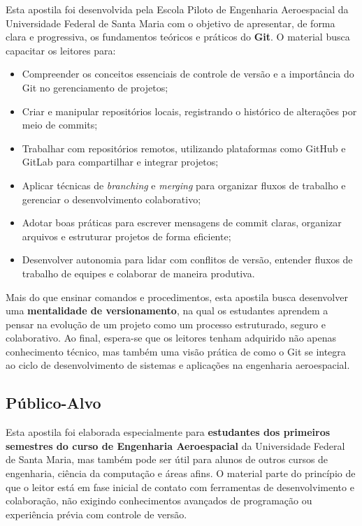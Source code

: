 Esta apostila foi desenvolvida pela Escola Piloto de Engenharia Aeroespacial da Universidade Federal de Santa Maria com o objetivo de apresentar, de forma clara e progressiva, os fundamentos teóricos e práticos do \textbf{Git}. O material busca capacitar os leitores para:

\begin{itemize}
    \item Compreender os conceitos essenciais de controle de versão e a importância do Git no gerenciamento de projetos;
    \item Criar e manipular repositórios locais, registrando o histórico de alterações por meio de commits;
    \item Trabalhar com repositórios remotos, utilizando plataformas como GitHub e GitLab para compartilhar e integrar projetos;
    \item Aplicar técnicas de \textit{branching} e \textit{merging} para organizar fluxos de trabalho e gerenciar o desenvolvimento colaborativo;
    \item Adotar boas práticas para escrever mensagens de commit claras, organizar arquivos e estruturar projetos de forma eficiente;
    \item Desenvolver autonomia para lidar com conflitos de versão, entender fluxos de trabalho de equipes e colaborar de maneira produtiva.
\end{itemize}

Mais do que ensinar comandos e procedimentos, esta apostila busca desenvolver uma \textbf{mentalidade de versionamento}, na qual os estudantes aprendem a pensar na evolução de um projeto como um processo estruturado, seguro e colaborativo. Ao final, espera-se que os leitores tenham adquirido não apenas conhecimento técnico, mas também uma visão prática de como o Git se integra ao ciclo de desenvolvimento de sistemas e aplicações na engenharia aeroespacial.

\subsection{Público-Alvo}

Esta apostila foi elaborada especialmente para \textbf{estudantes dos primeiros semestres do curso de Engenharia Aeroespacial} da Universidade Federal de Santa Maria, mas também pode ser útil para alunos de outros cursos de engenharia, ciência da computação e áreas afins. O material parte do princípio de que o leitor está em fase inicial de contato com ferramentas de desenvolvimento e colaboração, não exigindo conhecimentos avançados de programação ou experiência prévia com controle de versão.

